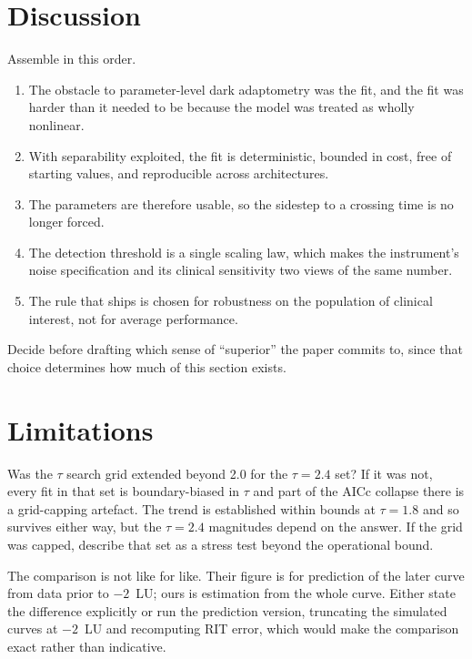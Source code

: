 \documentclass[11pt,a4paper]{article}
\begin{document}
\section{Discussion}
\begin{towrite}
Assemble in this order.
\begin{enumerate}[nosep]
\item The obstacle to parameter-level dark adaptometry was the fit, and the
  fit was harder than it needed to be because the model was treated as
  wholly nonlinear.
\item With separability exploited, the fit is deterministic, bounded in
  cost, free of starting values, and reproducible across architectures.
\item The parameters are therefore usable, so the sidestep to a crossing
  time is no longer forced.
\item The detection threshold is a single scaling law, which makes the
  instrument's noise specification and its clinical sensitivity two views of
  the same number.
\item The rule that ships is chosen for robustness on the population of
  clinical interest, not for average performance.
\end{enumerate}
Decide before drafting which sense of ``superior'' the paper commits to,
since that choice determines how much of this section exists.
\end{towrite}

\section{Limitations}
\label{sec:limits}
\begin{openq}
Was the $\tau$ search grid extended beyond 2.0 for the $\tau = 2.4$ set? If
it was not, every fit in that set is boundary-biased in $\tau$ and part of
the AICc collapse there is a grid-capping artefact. The trend is established
within bounds at $\tau = 1.8$ and so survives either way, but the $\tau=2.4$
magnitudes depend on the answer. If the grid was capped, describe that set
as a stress test beyond the operational bound.
\end{openq}

\begin{openq}
The \citet{DeSilva:2019aa} comparison is not like for like. Their figure is
for prediction of the later curve from data prior to $-2$~LU; ours is
estimation from the whole curve. Either state the difference explicitly or
run the prediction version, truncating the simulated curves at $-2$~LU and
recomputing RIT error, which would make the comparison exact rather than
indicative.
\end{openq}
\end{document}

